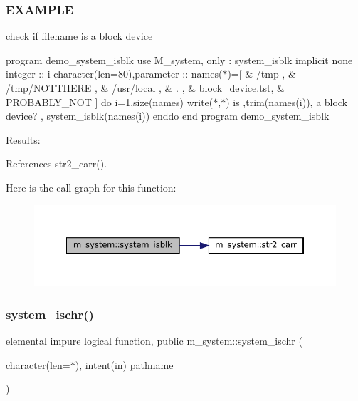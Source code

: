\subsubsection*{E\+X\+A\+M\+P\+LE}

check if filename is a block device

program demo\+\_\+system\+\_\+isblk use M\+\_\+system, only \+: system\+\_\+isblk implicit none integer \+:\+: i character(len=80),parameter \+:\+: names($\ast$)=\mbox{[} \& \textquotesingle{}/tmp \textquotesingle{}, \& \textquotesingle{}/tmp/\+N\+O\+T\+T\+H\+E\+RE \textquotesingle{}, \& \textquotesingle{}/usr/local \textquotesingle{}, \& \textquotesingle{}. \textquotesingle{}, \& \textquotesingle{}block\+\_\+device.\+tst\textquotesingle{}, \& \textquotesingle{}P\+R\+O\+B\+A\+B\+L\+Y\+\_\+\+N\+OT \textquotesingle{}\mbox{]} do i=1,size(names) write($\ast$,$\ast$)\textquotesingle{} is \textquotesingle{},trim(names(i)),\textquotesingle{} a block device? \textquotesingle{}, system\+\_\+isblk(names(i)) enddo end program demo\+\_\+system\+\_\+isblk

Results\+: 

References str2\+\_\+carr().

Here is the call graph for this function\+:\nopagebreak
\begin{figure}[H]
\begin{center}
\leavevmode
\includegraphics[width=350pt]{namespacem__system_a1294b8d8b4910261c0a0991bf668ab67_cgraph}
\end{center}
\end{figure}
\mbox{\label{namespacem__system_a49f1d027d438aab86024660b0802768f}} 
\subsubsection{\texorpdfstring{system\+\_\+ischr()}{system\_ischr()}}
{\footnotesize\ttfamily elemental impure logical function, public m\+\_\+system\+::system\+\_\+ischr (\begin{DoxyParamCaption}\item[{character(len=$\ast$), intent(in)}]{pathname }\end{DoxyParamCaption})}



